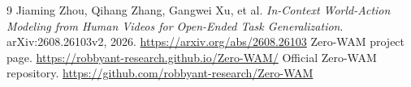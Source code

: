 \documentclass[11pt]{article}
\begin{document}
\begin{thebibliography}{9}
 Jiaming Zhou, Qihang Zhang, Gangwei Xu, et al. \emph{In-Context World-Action Modeling from Human Videos for Open-Ended Task Generalization}. arXiv:2608.26103v2, 2026. \url{https://arxiv.org/abs/2608.26103}
 Zero-WAM project page. \url{https://robbyant-research.github.io/Zero-WAM/}
 Official Zero-WAM repository. \url{https://github.com/robbyant-research/Zero-WAM}
\end{thebibliography}
\end{document}
